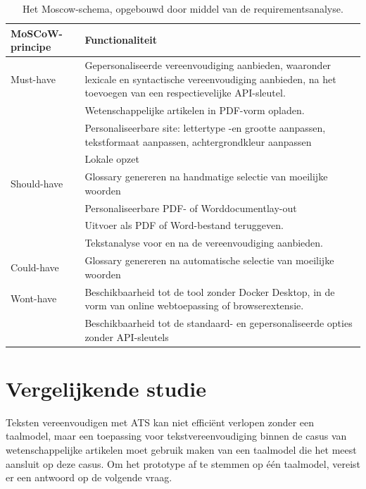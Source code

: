 \begin{center}
	\begin{table}

	\begin{tabular}{ | m{4cm} | m{12cm} | } 
		\hline
		\textbf{MoSCoW-principe} & Functionaliteit \\
		\hline
		Must-have & Gepersonaliseerde vereenvoudiging aanbieden, waaronder lexicale en syntactische vereenvoudiging aanbieden, na het toevoegen van een respectievelijke API-sleutel. \\
		& Wetenschappelijke artikelen in PDF-vorm opladen. \\
		& Personaliseerbare site: lettertype -en grootte aanpassen, tekstformaat aanpassen, achtergrondkleur aanpassen \\
		& Lokale opzet \\
		\hline
		Should-have & Glossary genereren na handmatige selectie van moeilijke woorden \\
		& Personaliseerbare PDF- of Worddocumentlay-out \\
		& Uitvoer als PDF of Word-bestand teruggeven. \\
		& Tekstanalyse voor en na de vereenvoudiging aanbieden. \\
		\hline
		Could-have & Glossary genereren na automatische selectie van moeilijke woorden \\
		\hline
		Wont-have & Beschikbaarheid tot de tool zonder Docker Desktop, in de vorm van online webtoepassing of browserextensie. \\
		& Beschikbaarheid tot de standaard- en gepersonaliseerde opties zonder API-sleutels \\
		\hline
	\end{tabular}
	\label{img:moscow-table}
	\caption{Het Moscow-schema, opgebouwd door middel van de requirementsanalyse.}
	\end{table}
\end{center}




\section{Vergelijkende studie}
\label{sec:vergelijkende-studie}

Teksten vereenvoudigen met ATS kan niet efficiënt verlopen zonder een taalmodel, maar een toepassing voor tekstvereenvoudiging binnen de casus van wetenschappelijke artikelen moet gebruik maken van een taalmodel die het meest aansluit op deze casus. Om het prototype af te stemmen op één taalmodel, vereist er een antwoord op de volgende vraag. 

